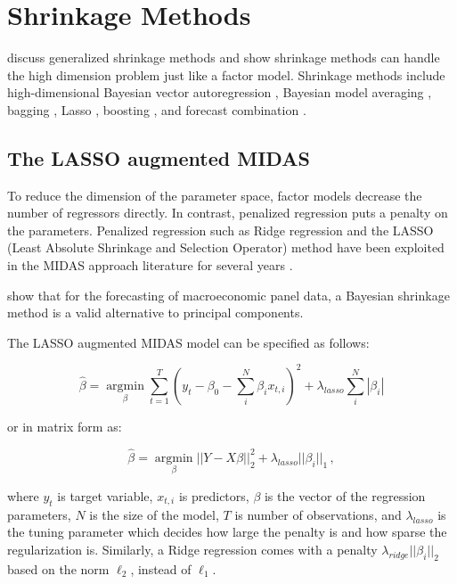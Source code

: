 \section{Shrinkage Methods} 

 discuss generalized shrinkage methods and show shrinkage methods can handle the high dimension problem just like a factor model. Shrinkage methods include high-dimensional Bayesian vector autoregression \cite{Andersson2008,Banbura2010,Korobilis2013,Carriero2011},  Bayesian model averaging   \cite{Koop2004,Wright2009}, bagging \cite{Inoue2008} , Lasso \cite{DeMol2008,Bai2009} , boosting \cite{Bai2007}, and forecast combination \cite{Timmermann2006}.



\subsection{The LASSO augmented MIDAS} 

To reduce the dimension of the parameter space, factor models  decrease the number of regressors directly. In contrast, penalized regression puts a penalty on the parameters. Penalized regression such as Ridge regression and the LASSO (Least Absolute Shrinkage and Selection Operator) method \cite{Tibshirani1994} have been exploited in the MIDAS approach literature for several years  \cite{DeMol2008,Ferrara2013}.  

  show that for the forecasting of macroeconomic panel data, a Bayesian shrinkage method is a valid alternative to principal components. 

The LASSO augmented MIDAS model can be specified as follows:

$$\hat \beta = \underset{\beta}{\operatorname{argmin}} \displaystyle\sum\limits_{t=1}^T (y_t - \beta_0 - \sum_i^N \beta_i x_{t,i})^2 + \lambda_{lasso} \sum_i^N  |\beta_i|$$

or in matrix form as:

$$\hat \beta =  \underset{\beta}{\operatorname{argmin}}  ||Y-X\beta||_2^2 +  \lambda_{lasso}   ||\beta_i||_1 \, ,$$ 

where $y_t$ is target variable, $x_{t,i}$ is predictors, $\beta$ is the vector of the regression parameters, $N$ is the size of the model, $T$ is number of observations, and $\lambda_{lasso}$ is the tuning parameter which decides how large the penalty is and how sparse the regularization is. Similarly, a Ridge regression comes with a penalty $\lambda_{ridge}||\beta_i||_2$ based on  the norm $\ell_2$,  instead of $\ell_1$. 

